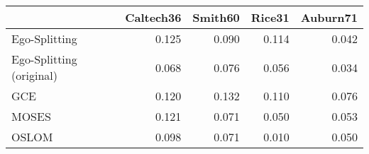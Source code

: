 \begin{tabular}{lrrrr}
\toprule
{} & Caltech36 & Smith60 & Rice31 & Auburn71 \\
\midrule
Ego-Splitting            &     0.125 &   0.090 &  0.114 &    0.042 \\
Ego-Splitting (original) &     0.068 &   0.076 &  0.056 &    0.034 \\
GCE                      &     0.120 &   0.132 &  0.110 &    0.076 \\
MOSES                    &     0.121 &   0.071 &  0.050 &    0.053 \\
OSLOM                    &     0.098 &   0.071 &  0.010 &    0.050 \\
\bottomrule
\end{tabular}
